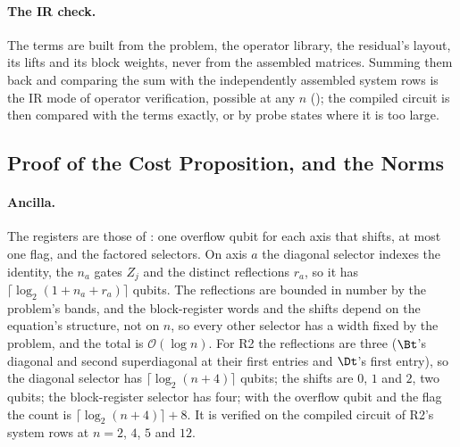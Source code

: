 \paragraph{The IR check.} The terms are built from the problem, the operator library, the residual's layout, its lifts and its block weights, never from the assembled matrices. Summing them back and comparing the sum with the independently assembled system rows is the IR mode of operator verification, possible at any $n$ (); the compiled circuit is then compared with the terms exactly, or by probe states where it is too large.

\subsection{Proof of the Cost Proposition, and the Norms}
\label{app:proof-descriptor-cost}

\paragraph{Ancilla.} The registers are those of : one overflow qubit for each axis that shifts, at most one flag, and the factored selectors. On axis $a$ the diagonal selector indexes the identity, the $n_a$ gates $Z_j$ and the distinct reflections $r_a$, so it has $\lceil\log_2(1+n_a+r_a)\rceil$ qubits. The reflections are bounded in number by the problem's bands, and the block-register words and the shifts depend on the equation's structure, not on $n$, so every other selector has a width fixed by the problem, and the total is $\mathcal{O}(\log n)$. For R2 the reflections are three ($\Bt$'s diagonal and second superdiagonal at their first entries and $\Dt$'s first entry), so the diagonal selector has $\lceil\log_2(n+4)\rceil$ qubits; the shifts are $0$, $1$ and $2$, two qubits; the block-register selector has four; with the overflow qubit and the flag the count is $\lceil\log_2(n+4)\rceil+8$. It is verified on the compiled circuit of R2's system rows at $n=2$, $4$, $5$ and $12$.

